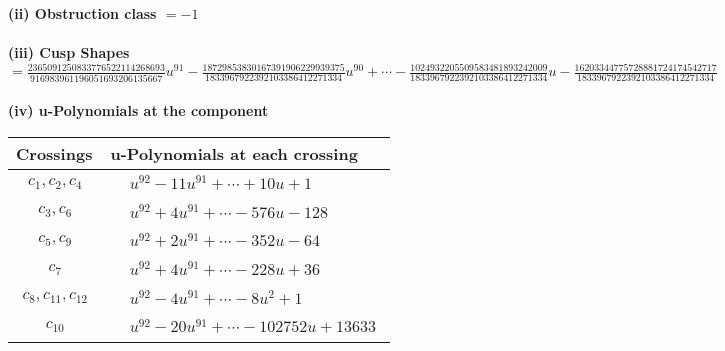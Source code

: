 \documentclass[1p]{elsarticle_modified}
\theoremstyle{definition}
\begin{document}
\flushleft \textbf{(ii) Obstruction class $= -1$}\\~\\
\flushleft \textbf{(iii) Cusp Shapes $= \frac{2365091250833776522114268693}{916983961196051693206135667} u^{91}-\frac{18729853830167391906229939375}{1833967922392103386412271334} u^{90}+\cdots-\frac{1024932205509583481893242009}{1833967922392103386412271334} u-\frac{16203344775728881724174542717}{1833967922392103386412271334}$}\\~\\
\newpage\renewcommand{\arraystretch}{1}
\flushleft \textbf{(iv) u-Polynomials at the component}\newline \\
\begin{tabular}{m{50pt}|m{274pt}}
Crossings & \hspace{64pt}u-Polynomials at each crossing \\
\hline $$\begin{aligned}c_{1},c_{2},c_{4}\end{aligned}$$&$\begin{aligned}
&u^{92}-11 u^{91}+\cdots+10 u+1
\end{aligned}$\\
\hline $$\begin{aligned}c_{3},c_{6}\end{aligned}$$&$\begin{aligned}
&u^{92}+4 u^{91}+\cdots-576 u-128
\end{aligned}$\\
\hline $$\begin{aligned}c_{5},c_{9}\end{aligned}$$&$\begin{aligned}
&u^{92}+2 u^{91}+\cdots-352 u-64
\end{aligned}$\\
\hline $$\begin{aligned}c_{7}\end{aligned}$$&$\begin{aligned}
&u^{92}+4 u^{91}+\cdots-228 u+36
\end{aligned}$\\
\hline $$\begin{aligned}c_{8},c_{11},c_{12}\end{aligned}$$&$\begin{aligned}
&u^{92}-4 u^{91}+\cdots-8 u^2+1
\end{aligned}$\\
\hline $$\begin{aligned}c_{10}\end{aligned}$$&$\begin{aligned}
&u^{92}-20 u^{91}+\cdots-102752 u+13633
\end{aligned}$\\
\hline
\end{tabular}\\~\\
\end{document}

